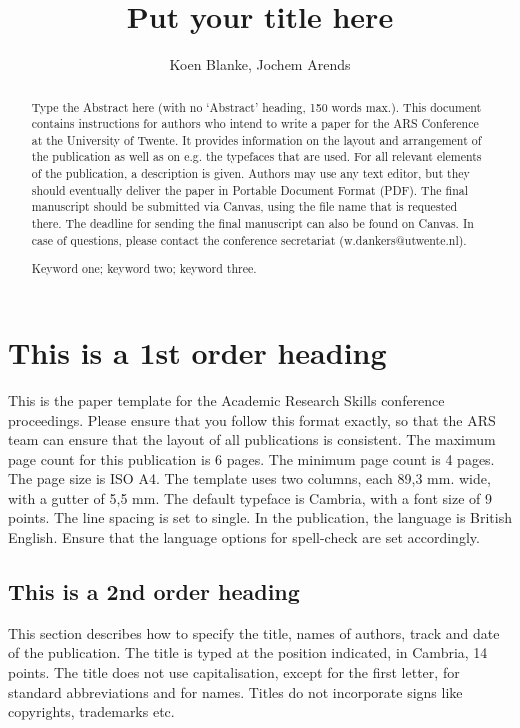 \documentclass{paper}
\title{Put your title here}
\author{Koen Blanke, Jochem Arends}
\begin{document}
\maketitle

\begin{abstract}

Type the Abstract here (with no ‘Abstract’ heading, 150 words max.).
This document contains instructions for authors who intend to write a paper for the ARS Conference at the University of Twente.
It provides information on the layout and arrangement of the publication as well as on e.g. the typefaces that are used.
For all relevant elements of the publication, a description is given.
Authors may use any text editor, but they should eventually deliver the paper in Portable Document Format (PDF).
The final manuscript should be submitted via
Canvas, using the file name that is requested there.
The deadline for sending the final manuscript can also be found on Canvas.
In case of questions, please contact the conference secretariat (w.dankers@utwente.nl).
\\
\par
Keyword one; keyword two; keyword three.

\end{abstract}

\section{This is a 1st order heading}

This is the paper template for the Academic Research Skills conference proceedings.
Please ensure that you follow this format exactly, so that the ARS team can ensure that the layout of all publications is consistent.
The maximum page count for this publication is 6 pages.
The minimum page count is 4 pages.
The page size is ISO A4.
The template uses two columns, each 89,3 mm.
wide, with a gutter of 5,5 mm.
The default typeface is Cambria, with a font size of 9 points.
The line spacing is set to single.
In the publication, the language is British English.
Ensure that the language options for spell-check are set accordingly.

\subsection{This is a 2nd order heading}

This section describes how to specify the title, names of authors, track and date of the publication.
The title is typed at the position indicated, in Cambria, 14 points.
The title does not use capitalisation, except for the first letter, for standard abbreviations and for names.
Titles do not incorporate signs like copyrights, trademarks etc.
\end{document}
